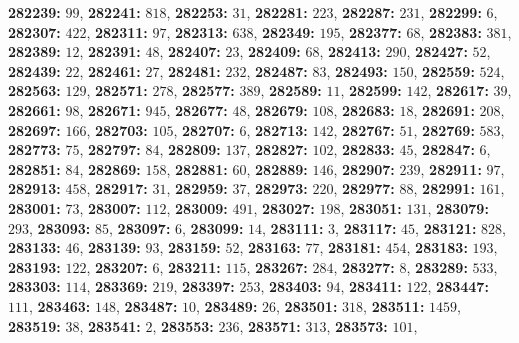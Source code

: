 \textsf{\bfseries 282239:} $99$, \textsf{\bfseries 282241:} $818$, \textsf{\bfseries 282253:} $31$, \textsf{\bfseries 282281:} $223$, \textsf{\bfseries 282287:} $231$, \textsf{\bfseries 282299:} $6$, \textsf{\bfseries 282307:} $422$, \textsf{\bfseries 282311:} $97$, \textsf{\bfseries 282313:} $638$, \textsf{\bfseries 282349:} $195$, \textsf{\bfseries 282377:} $68$, \textsf{\bfseries 282383:} $381$, \textsf{\bfseries 282389:} $12$, \textsf{\bfseries 282391:} $48$, \textsf{\bfseries 282407:} $23$, \textsf{\bfseries 282409:} $68$, \textsf{\bfseries 282413:} $290$, \textsf{\bfseries 282427:} $52$, \textsf{\bfseries 282439:} $22$, \textsf{\bfseries 282461:} $27$, \textsf{\bfseries 282481:} $232$, \textsf{\bfseries 282487:} $83$, \textsf{\bfseries 282493:} $150$, \textsf{\bfseries 282559:} $524$, \textsf{\bfseries 282563:} $129$, \textsf{\bfseries 282571:} $278$, \textsf{\bfseries 282577:} $389$, \textsf{\bfseries 282589:} $11$, \textsf{\bfseries 282599:} $142$, \textsf{\bfseries 282617:} $39$, \textsf{\bfseries 282661:} $98$, \textsf{\bfseries 282671:} $945$, \textsf{\bfseries 282677:} $48$, \textsf{\bfseries 282679:} $108$, \textsf{\bfseries 282683:} $18$, \textsf{\bfseries 282691:} $208$, \textsf{\bfseries 282697:} $166$, \textsf{\bfseries 282703:} $105$, \textsf{\bfseries 282707:} $6$, \textsf{\bfseries 282713:} $142$, \textsf{\bfseries 282767:} $51$, \textsf{\bfseries 282769:} $583$, \textsf{\bfseries 282773:} $75$, \textsf{\bfseries 282797:} $84$, \textsf{\bfseries 282809:} $137$, \textsf{\bfseries 282827:} $102$, \textsf{\bfseries 282833:} $45$, \textsf{\bfseries 282847:} $6$, \textsf{\bfseries 282851:} $84$, \textsf{\bfseries 282869:} $158$, \textsf{\bfseries 282881:} $60$, \textsf{\bfseries 282889:} $146$, \textsf{\bfseries 282907:} $239$, \textsf{\bfseries 282911:} $97$, \textsf{\bfseries 282913:} $458$, \textsf{\bfseries 282917:} $31$, \textsf{\bfseries 282959:} $37$, \textsf{\bfseries 282973:} $220$, \textsf{\bfseries 282977:} $88$, \textsf{\bfseries 282991:} $161$, \textsf{\bfseries 283001:} $73$, \textsf{\bfseries 283007:} $112$, \textsf{\bfseries 283009:} $491$, \textsf{\bfseries 283027:} $198$, \textsf{\bfseries 283051:} $131$, \textsf{\bfseries 283079:} $293$, \textsf{\bfseries 283093:} $85$, \textsf{\bfseries 283097:} $6$, \textsf{\bfseries 283099:} $14$, \textsf{\bfseries 283111:} $3$, \textsf{\bfseries 283117:} $45$, \textsf{\bfseries 283121:} $828$, \textsf{\bfseries 283133:} $46$, \textsf{\bfseries 283139:} $93$, \textsf{\bfseries 283159:} $52$, \textsf{\bfseries 283163:} $77$, \textsf{\bfseries 283181:} $454$, \textsf{\bfseries 283183:} $193$, \textsf{\bfseries 283193:} $122$, \textsf{\bfseries 283207:} $6$, \textsf{\bfseries 283211:} $115$, \textsf{\bfseries 283267:} $284$, \textsf{\bfseries 283277:} $8$, \textsf{\bfseries 283289:} $533$, \textsf{\bfseries 283303:} $114$, \textsf{\bfseries 283369:} $219$, \textsf{\bfseries 283397:} $253$, \textsf{\bfseries 283403:} $94$, \textsf{\bfseries 283411:} $122$, \textsf{\bfseries 283447:} $111$, \textsf{\bfseries 283463:} $148$, \textsf{\bfseries 283487:} $10$, \textsf{\bfseries 283489:} $26$, \textsf{\bfseries 283501:} $318$, \textsf{\bfseries 283511:} $1459$, \textsf{\bfseries 283519:} $38$, \textsf{\bfseries 283541:} $2$, \textsf{\bfseries 283553:} $236$, \textsf{\bfseries 283571:} $313$, \textsf{\bfseries 283573:} $101$, 
